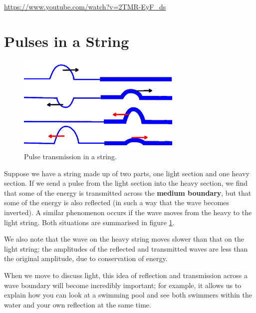 \documentclass[a4paper]{amsbook}
\newcommand\capcite[1]{}
\begin{document}
\begin{center}
\begin{tcolorbox}[width=0.8\textwidth,colback={red},title={\textbf{Go and watch...}},colbacktitle=yellow,coltitle=blue]
  \textcolor{white}{\url{https://www.youtube.com/watch?v=2TMR-EyF_ds}}
\end{tcolorbox}
\end{center}

\section{Pulses in a String}
\begin{figure}
  \centering
  \includegraphics[width=0.7\textwidth]{string}
  \caption{Pulse transmission in a string. \capcite{http://minerva.union.edu/newmanj/physics100/light\%20as\%20a\%20wave/outofphasewaves.gif}\label{fig:string}}
\end{figure}
Suppose we have a string made up of two parts, one light section and one heavy section. If we send a pulse from the light section
into the heavy section, we find that some of the energy is transmitted across the \textbf{medium boundary}, but that some of the
energy is also reflected (in such a way that the wave becomes inverted). A similar phenomenon occurs if the wave moves from the
heavy to the light string. Both situations are summarised in figure \ref{fig:string}.

We also note that the wave on the heavy string moves slower than that on the light string; the amplitudes of the reflected and transmitted
waves are less than the original amplitude, due to conservation of energy.

When we move to discuss light, this idea of reflection and transmission across a wave boundary will become incredibly important;
for example, it allows us to explain how you can look at a swimming pool and see both swimmers within the water and your own reflection
at the same time.
\end{document}
